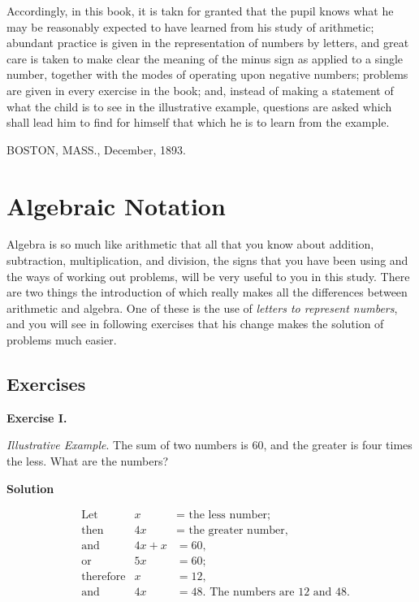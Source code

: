 \documentclass[12pt,oneside]{book}
\begin{document}
Accordingly, in this book, it is takn for granted that the pupil knows what he may be reasonably expected
to have learned from his study of arithmetic; abundant practice is given in the representation of numbers by letters,
and great care is taken to make clear the meaning of the minus sign as applied to a single number,
together with the modes of operating upon negative numbers; problems are given in every exercise in the book;
and, instead of making a statement of what the child is to see in the illustrative example, questions are asked 
which shall lead him to find for himself that which he is to learn from the example. \par 

BOSTON, MASS., December, 1893. \par

\tableofcontents

\mainmatter

\chapter{Algebraic Notation}
Algebra is so much like arithmetic that all that you know about addition, subtraction, multiplication, and 
division, the signs that you have been using and the ways of working out problems, will be very useful
to you in this study. There are two things the introduction of which really makes all the differences between
arithmetic and algebra. One of these is the use of \textit{letters to represent numbers}, and you will see in 
following exercises that his change makes the solution of problems much easier. \par 

\section{Exercises}
{\large \textbf{Exercise I.}} \par 
\textit{Illustrative Example}. The sum of two numbers is 60, and the greater is four times the less.
What are the numbers? \par

\begin{center}
    \textbf{Solution} \par 
        \begin{align*}
        &\text{Let} & x&=\text{ the less number;}\\
        &\text{then} & 4x&=\text{ the greater number,}\\
        &\text{and} & 4x+x&=60,\\
        &\text{or} & 5x&=60;\\
        &\text{therefore} & x&=12,\\
        &\text{and} & 4x&=48. \text{ The numbers are 12 and 48.}\\
        \end{align*}
\end{center}
\end{document}

